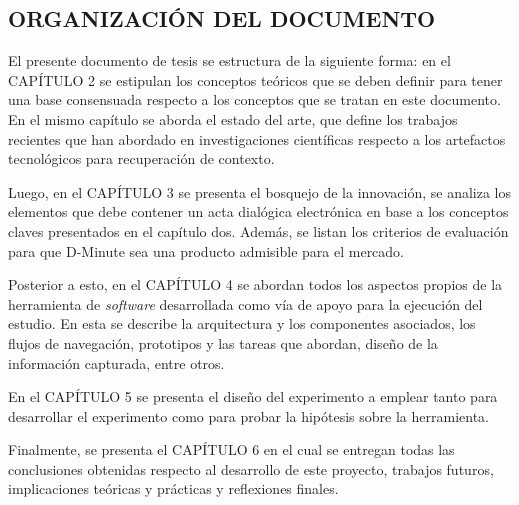 \subsection{ORGANIZACIÓN DEL DOCUMENTO}

El presente documento de tesis se estructura de la siguiente forma: en el CAPÍTULO 2 se estipulan los conceptos teóricos que se deben definir para tener una base consensuada respecto a los conceptos que se tratan en este documento. En el mismo capítulo se aborda el estado del arte, que define los trabajos recientes que han abordado en investigaciones científicas respecto a los artefactos tecnológicos para recuperación de contexto.

Luego, en el CAPÍTULO 3 se presenta el bosquejo de la innovación, se analiza los elementos que debe contener un acta dialógica electrónica en base a los conceptos claves presentados en el capítulo dos. Además, se listan los criterios de evaluación para que D-Minute sea una producto admisible para el mercado.

Posterior a esto, en el CAPÍTULO 4 se abordan todos los aspectos propios de la herramienta de \textit{software} desarrollada como vía de apoyo para la ejecución del estudio. En esta se describe la arquitectura y los componentes asociados, los flujos de navegación, prototipos y las tareas que abordan, diseño de la información capturada, entre otros.

En el CAPÍTULO 5 se presenta el diseño del experimento a emplear tanto para desarrollar el experimento como para probar la hipótesis sobre la herramienta. 

Finalmente, se presenta el CAPÍTULO 6 en el cual se entregan todas las conclusiones obtenidas respecto al desarrollo de este proyecto, trabajos futuros, implicaciones teóricas y prácticas y reflexiones finales.









